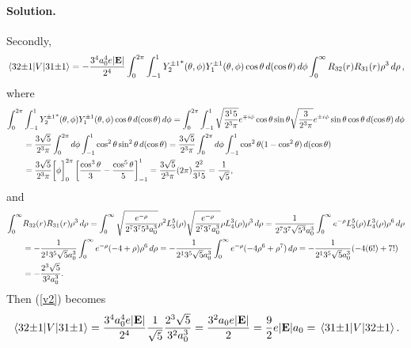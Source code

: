 \documentclass[11pt]{article}
\newcommand{\refeq}[1]{(\ref{#1})}
\newcommand{\beq}{\begin{equation*}}
\newcommand{\eeq}{\end{equation*}}
\newcommand{\beqn}{\begin{equation}}
\newcommand{\eeqn}{\end{equation}}
\newenvironment{solution}
{
    \paragraph{Solution.}
    \ignorespaces
}
{
}
\begin{document}
\begin{solution}
	Secondly,
	\beqn \label{v2}
		\mel{3 2 {\pm1}}{V}{3 1 {\pm1}} = -\frac{3^4 \ao^4 e |\vE|}{2^4} \int_0^{2\pi} \int_{-1}^1 {Y_2^{\pm1}}^*(\tht, \phi) Y_1^{\pm1}(\tht, \phi) \cos\tht \dcost \dphi \int_0^\infty R_{3 2}(r) R_{3 1}(r) \rho^3 \drho,
	\eeqn
	where
	\begin{align*}
		\int_0^{2\pi} &\int_{-1}^1 {Y_2^{\pm1}}^*(\theta, \phi) Y_1^{\pm1}(\theta, \phi) \cos\theta \dd{(\cos\theta)} \dd{\phi}
		= \int_0^{2\pi} \int_{-1}^1 \sqrt{\frac{3^1 5}{2^3 \pi}} e^{\mp i \phi} \cos\theta \sin\theta \sqrt{\frac{3}{2^3 \pi}} e^{\pm i \phi} \sin\theta \cos\theta \dd{(\cos\theta)} \dd{\phi} \\
		&= \frac{3 \sqrt{5}}{2^3 \pi} \int_0^{2\pi} \dd{\phi} \int_{-1}^1 \cos^2\theta \sin^2\theta \dd{(\cos\theta)}
		= \frac{3 \sqrt{5}}{2^3 \pi} \int_0^{2\pi} \dd{\phi} \int_{-1}^1 \cos^2\theta (1 - \cos^2\theta) \dd{(\cos\theta)} \\
		&= \frac{3 \sqrt{5}}{2^3 \pi} \bigg[ \phi \bigg]_0^{2\pi} \left[ \frac{\cos^3\theta}{3} - \frac{\cos^5\theta}{5} \right]_{-1}^1
		= \frac{3 \sqrt{5}}{2^3 \pi} (2\pi) \frac{2^2}{3^1 5}
		= \frac{1}{\sqrt{5}},
	\end{align*}
	and
	\begin{align*}
		\int_0^\infty &R_{3 2}(r) R_{3 1}(r) \rho^3 \dd{\rho}
		= \int_0^\infty \sqrt{\frac{e^{-\rho}}{2^7 3^7 5^3 a_0^3}} \rho^2 L_5^5(\rho) \sqrt{\frac{e^{-\rho}}{2^7 3^7 a_0^3}} \rho L_4^3(\rho) \rho^3 \dd{\rho}
		= \frac{1}{2^7 3^7 \sqrt{5^3} a_0^3} \int_0^\infty e^{-\rho} L_5^5(\rho) L_4^3(\rho) \rho^6 \dd{\rho} \\
		&= -\frac{1}{2^1 3^5 \sqrt{5} a_0^3} \int_0^\infty e^{-\rho} (-4 + \rho) \rho^6 \dd{\rho}
		= -\frac{1}{2^1 3^5 \sqrt{5} a_0^3} \int_0^\infty e^{-\rho} (-4 \rho^6 + \rho^7) \dd{\rho}
		= -\frac{1}{2^1 3^5 \sqrt{5} a_0^3} (-4 (6!) + 7!) \\
		&= -\frac{2^3 \sqrt{5}}{3^2 a_0^3}.
	\end{align*}
	Then \refeq{v2} becomes
	\beq
		\mel{3 2 {\pm1}}{V}{3 1 {\pm1}} = \frac{3^4 \ao^4 e |\vE|}{2^4} \frac{1}{\sqrt{5}} \frac{2^3 \sqrt{5}}{3^2 \ao^3}
		= \frac{3^2 \ao e |\vE|}{2}
		= \frac{9}{2} e |\vE| \ao
		= \mel{3 1 {\pm1}}{V}{3 2 {\pm1}}.
	\eeq
	

\end{solution}
\end{document}
